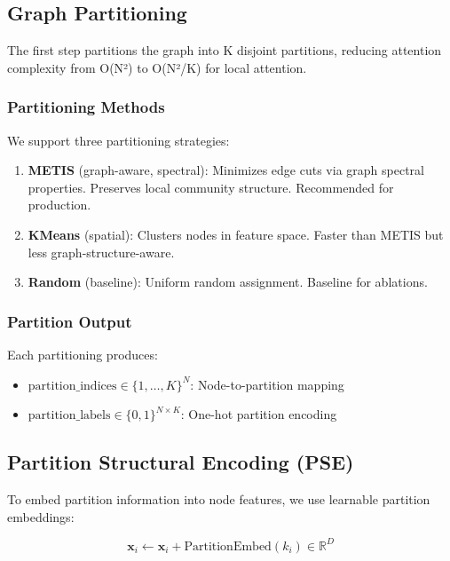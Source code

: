 \documentclass[11pt, a4paper]{article}
\begin{document}
\subsection{Graph Partitioning}

The first step partitions the graph into K disjoint partitions, reducing attention complexity from O(N²) to O(N²/K) for local attention.

\subsubsection{Partitioning Methods}

We support three partitioning strategies:

\begin{enumerate}
    \item \textbf{METIS} (graph-aware, spectral): Minimizes edge cuts via graph spectral properties. Preserves local community structure. Recommended for production.
    
    \item \textbf{KMeans} (spatial): Clusters nodes in feature space. Faster than METIS but less graph-structure-aware.
    
    \item \textbf{Random} (baseline): Uniform random assignment. Baseline for ablations.
\end{enumerate}

\subsubsection{Partition Output}

Each partitioning produces:
\begin{itemize}
    \item $\text{partition\_indices} \in \{1, \ldots, K\}^N$: Node-to-partition mapping
    \item $\text{partition\_labels} \in \{0,1\}^{N \times K}$: One-hot partition encoding
\end{itemize}

\subsection{Partition Structural Encoding (PSE)}

To embed partition information into node features, we use learnable partition embeddings:

\begin{equation}
\mathbf{x}_i \leftarrow \mathbf{x}_i + \text{PartitionEmbed}(k_i) \in \mathbb{R}^{D}
\end{equation}
\end{document}

